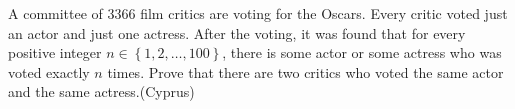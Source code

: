 A committee of $3366$ film critics are voting for the Oscars. Every critic voted just an actor and just one actress. After the voting, it was found that for every positive integer $n \in \left \{1, 2, \ldots, 100 \right \}$,  there is some actor or some actress who was voted exactly $n$ times. Prove that there are two critics who voted the same actor and the same actress.(Cyprus)